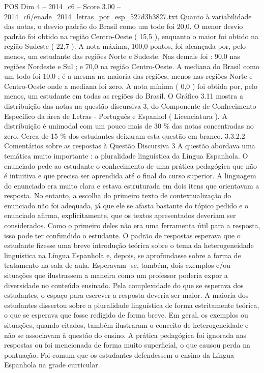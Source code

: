 \begin{textsample}{POS Dim 4 – 2014\_c6 – Score 3.00 – 2014\_c6/enade\_2014\_letras\_por\_esp\_527d3b3827.txt}
Quanto à variabilidade das notas, o desvio padrão do Brasil como um todo foi 20,0.
O menor desvio padrão foi obtido na região Centro-Oeste ( 15,5 ), enquanto o maior foi obtido na região Sudeste ( 22,7 ).
A nota máxima, 100,0 pontos, foi alcançada por, pelo menos, um estudante das regiões Norte e Sudeste.
Nas demais foi : 90,0 nas regiões Nordeste e Sul ; e 70,0 na região Centro-Oeste.
A mediana do Brasil como um todo foi 10,0 ; é a mesma na maioria das regiões, menos nas regiões Norte e Centro-Oeste onde a mediana foi zero.
A nota mínima ( 0,0 ) foi obtida por, pelo menos, um estudante em todas as regiões do Brasil.
O Gráfico 3.11 mostra a distribuição das notas na questão discursiva 3, do Componente de Conhecimento Específico da área de Letras - Português e Espanhol ( Licenciatura ).
A distribuição é unimodal com um pouco mais de 30 \% das notas concentradas no zero.
Cerca de 15 \% dos estudantes deixaram esta questão em branco. 3.3.2.2 Comentários sobre as respostas à Questão Discursiva 3 A questão abordava uma temática muito importante : a pluralidade linguística da Língua Espanhola.
O enunciado pede ao estudante o conhecimento de uma prática pedagógica que não é intuitiva e que precisa ser aprendida até o final do curso superior.
A linguagem do enunciado era muito clara e estava estruturada em dois itens que orientavam a resposta.
No entanto, a escolha do primeiro texto de contextualização do enunciado não foi adequada, já que ele se afasta bastante do tópico pedido e o enunciado afirma, explicitamente, que os textos apresentados deveriam ser considerados.
Como o primeiro deles não era uma ferramenta útil para a resposta, isso pode ter confundido o estudante.
O padrão de respostas esperava que o estudante fizesse uma breve introdução teórica sobre o tema da heterogeneidade linguística na Língua Espanhola e, depois, se aprofundasse sobre a forma de tratamento na sala de aula.
Esperavam -se, também, dois exemplos e/ou situações que ilustrassem a maneira como um professor poderia expor a diversidade no conteúdo ensinado.
Pela complexidade do que se esperava dos estudantes, o espaço para escrever a resposta deveria ser maior.
A maioria dos estudantes dissertou sobre a pluralidade linguística de forma estritamente teórica, o que se esperava que fosse redigido de forma breve.
Em geral, os exemplos ou situações, quando citados, também ilustraram o conceito de heterogeneidade e não se associavam à questão do ensino.
A prática pedagógica foi ignorada nas respostas ou foi mencionada de forma muito superficial, o que causou perda na pontuação.
Foi comum que os estudantes defendessem o ensino da Língua Espanhola na grade curricular.

\end{textsample}
